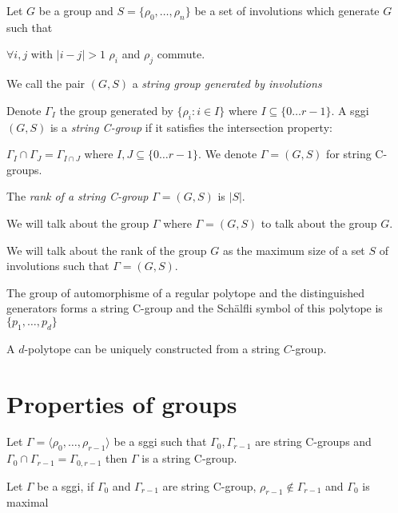 \begin{definition}
  Let $G$ be a group and $S = \{\rho_0, \dots, \rho_n\}$ be a set of involutions which generate $G$ such that
  \begin{center}
    $\forall i,j$ with $| i - j| > 1$ $\rho_i$ and $\rho_j$ commute.
  \end{center}
  We call the pair $(G,S)$ a \textit{string group generated by involutions}
\end{definition}

\begin{definition}
  Denote $\Gamma_I$ the group generated by $\{\rho_i : i \in I\}$ where $I \subseteq \{0\dots r-1\}$. A sggi $(G,S)$ is a \textit{string C-group} if it satisfies the intersection property:
  \begin{center}
    $\Gamma_I \cap \Gamma_J = \Gamma_{I \cap J}$ where $I, J \subseteq \{0\dots r-1\}$. We denote $\Gamma = (G,S)$ for string C-groups.
  \end{center}
\end{definition}

\begin{definition}
  The \textit{rank of a string C-group} $\Gamma = (G,S)$ is $|S|$.
\end{definition}

\begin{remark}
  We will talk about the group $\Gamma$ where $\Gamma = (G,S)$ to talk about the group $G$.
\end{remark}

\begin{remark}[Rank of $G$]
  We will talk about the rank of the group $G$ as the maximum size of a set $S$ of involutions such that $\Gamma = (G,S)$.
\end{remark}

\begin{property}
  The group of automorphisme of a regular polytope and the distinguished generators forms a string C-group and the Schälfli symbol of this polytope is $\{p_1, \dots, p_d\}$
\end{property}

\begin{property}
  A $d$-polytope can be uniquely constructed from a string $C$-group.
\end{property}

\section{Properties of groups}

\begin{property}
  Let $\Gamma = \langle \rho_0, \dots, \rho_{r-1} \rangle$ be a sggi such that $\Gamma_0, \Gamma_{r-1}$ are string C-groups and $\Gamma_0 \cap \Gamma_{r-1} = \Gamma_{0,r-1}$ then $\Gamma$ is a string C-group.
\end{property}

\begin{property}
  Let $\Gamma$ be a sggi, if $\Gamma_0$ and $\Gamma_{r-1}$ are string C-group, $\rho_{r-1} \notin \Gamma_{r-1}$ and $\Gamma_0$ is maximal
\end{property}
